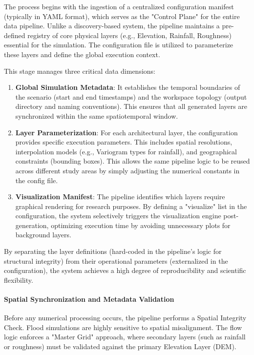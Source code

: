 The process begins with the ingestion of a centralized configuration manifest (typically in YAML format), 
which serves as the "Control Plane" for the entire data pipeline. Unlike a discovery-based system, the pipeline 
maintains a pre-defined registry of core physical layers (e.g., Elevation, Rainfall, Roughness) essential for 
the simulation. The configuration file is utilized to parameterize these layers and define the global execution 
context.

This stage manages three critical data dimensions:

\begin{enumerate}
    \item \textbf{Global Simulation Metadata}: It establishes the temporal boundaries of the scenario (start and 
    end timestamps) and the workspace topology (output directory and naming conventions). This ensures that all 
    generated layers are synchronized within the same spatiotemporal window.
    \item \textbf{Layer Parameterization}: For each architectural layer, the configuration provides specific 
    execution parameters. This includes spatial resolutions, interpolation models (e.g., Variogram types for 
    rainfall), and geographical constraints (bounding boxes). This allows the same pipeline logic to be reused 
    across different study areas by simply adjusting the numerical constants in the config file.
    \item \textbf{Visualization Manifest}: The pipeline identifies which layers require graphical rendering for 
    research purposes. By defining a "visualize" list in the configuration, the system selectively triggers the 
    visualization engine post-generation, optimizing execution time by avoiding unnecessary plots for background 
    layers.
\end{enumerate}

By separating the layer definitions (hard-coded in the pipeline's logic for structural integrity) from their 
operational parameters (externalized in the configuration), the system achieves a high degree of reproducibility 
and scientific flexibility.

\paragraph{Spatial Synchronization and Metadata Validation}

Before any numerical processing occurs, the pipeline performs a Spatial Integrity Check. Flood simulations 
are highly sensitive to spatial misalignment. The flow logic enforces a "Master Grid" approach, where 
secondary layers (such as rainfall or roughness) must be validated against the primary Elevation Layer (DEM).

